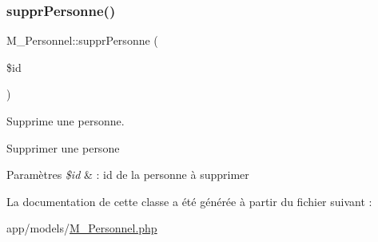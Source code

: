 \subsubsection{\texorpdfstring{suppr\+Personne()}{supprPersonne()}}
{\footnotesize\ttfamily M\+\_\+\+Personnel\+::suppr\+Personne (\begin{DoxyParamCaption}\item[{}]{\$id }\end{DoxyParamCaption})}



Supprime une personne. 

Supprimer une persone 
\begin{DoxyParams}{Paramètres}
{\em \$id} & \+: id de la personne à supprimer \\
\hline
\end{DoxyParams}


La documentation de cette classe a été générée à partir du fichier suivant \+:\begin{DoxyCompactItemize}
\item 
app/models/\hyperlink{_m___personnel_8php}{M\+\_\+\+Personnel.\+php}\end{DoxyCompactItemize}
